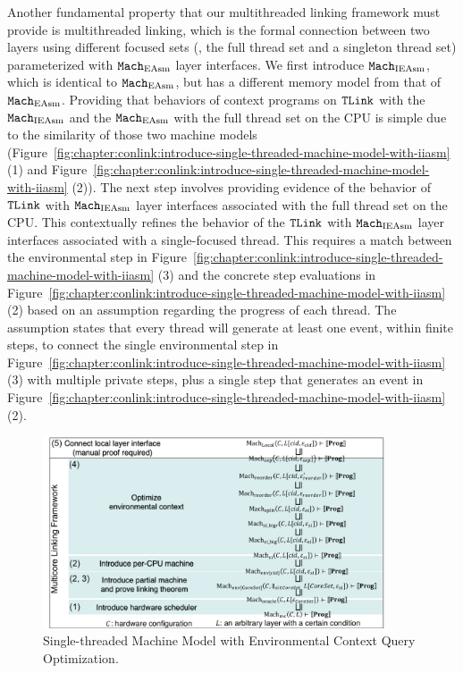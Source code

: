 Another fundamental property that our multithreaded linking framework must provide is multithreaded linking, which is the formal connection between two layers using different focused sets (\ie, the full thread set and a singleton thread set) parameterized with  ${\mathrm{\texttt{Mach}}}_{\mathrm{EAsm}}$ 
layer interfaces. 
We first introduce ${\mathrm{\texttt{Mach}}}_{\mathrm{IEAsm}}$, which is identical to  ${\mathrm{\texttt{Mach}}}_{\mathrm{EAsm}}$, but has a different memory model from that of ${\mathrm{\texttt{Mach}}}_{\mathrm{EAsm}}$.
Providing that behaviors of context programs on ${{\mathrm{\texttt{TLink}}}}$ with the ${\mathrm{\texttt{Mach}}}_{\mathrm{IEAsm}}$  and the ${\mathrm{\texttt{Mach}}}_{\mathrm{EAsm}}$ with the full thread set on the CPU is simple 
due to the similarity of those two machine models (Figure~\ref{fig:chapter:conlink:introduce-single-threaded-machine-model-with-iiasm} (1) and Figure~\ref{fig:chapter:conlink:introduce-single-threaded-machine-model-with-iiasm} (2)). 
The next step involves providing evidence of the behavior of ${{\mathrm{\texttt{TLink}}}}$ with  ${\mathrm{\texttt{Mach}}}_{\mathrm{IEAsm}}$ layer interfaces associated with the full thread set on the CPU. 
This contextually refines the behavior of the ${{\mathrm{\texttt{TLink}}}}$ with  ${\mathrm{\texttt{Mach}}}_{\mathrm{IEAsm}}$ layer interfaces associated with a single-focused thread. 
This requires a match between the environmental step in Figure~\ref{fig:chapter:conlink:introduce-single-threaded-machine-model-with-iiasm} (3) and the concrete step evaluations in Figure~\ref{fig:chapter:conlink:introduce-single-threaded-machine-model-with-iiasm} (2) based on an assumption regarding the progress of each thread. 
The assumption states that every thread will generate at least one event, within finite steps, to connect the single environmental step in Figure~\ref{fig:chapter:conlink:introduce-single-threaded-machine-model-with-iiasm} (3) with multiple private steps, plus a single step that generates an event in Figure~\ref{fig:chapter:conlink:introduce-single-threaded-machine-model-with-iiasm} (2).

\begin{figure}
\begin{center}
\includegraphics[width=0.9\textwidth, page=8]{figs/conlink/concurrent_linking}
\end{center}
\caption{Single-threaded Machine Model with Environmental Context Query Optimization.}
\label{fig:chapter:conlink:introduce-single-threaded-machine-model-with-tasm}
\end{figure}

